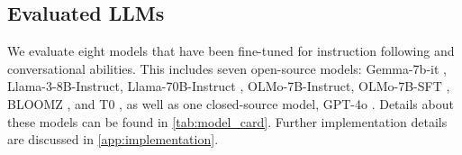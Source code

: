 
\subsection{Evaluated LLMs} We evaluate eight models that have been fine-tuned for instruction following and conversational abilities. This includes seven open-source models: Gemma-7b-it \cite{team2024gemma}, Llama-3-8B-Instruct, Llama-70B-Instruct \cite{dubey2024llama3herdmodels}, OLMo-7B-Instruct, OLMo-7B-SFT \cite{groeneveld-etal-2024-olmo}, BLOOMZ \cite{muennighoff2022crosslingual}, and T0 \cite{sanh2021multitask}, as well as one closed-source model, GPT-4o \cite{openai2023gpt4}. Details about these models can be found in \autoref{tab:model_card}. Further implementation details are discussed in \autoref{app:implementation}.

